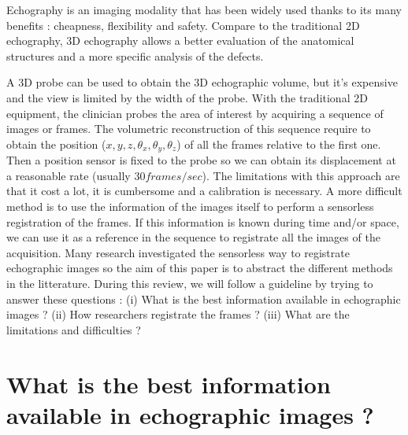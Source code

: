 \documentclass[runningheads,a4paper]{llncs}
\begin{document}
Echography is an imaging modality that has been widely used thanks to its many benefits : cheapness, flexibility and safety. 
Compare to the traditional 2D echography, 3D echography allows a better evaluation of the anatomical structures and a more specific analysis of the defects.\par
A 3D probe can be used to obtain the 3D echographic volume, but it's expensive and the view is limited by the width of the probe. 
With the traditional 2D equipment, the clinician probes the area of interest by acquiring a sequence of images or frames.
The volumetric reconstruction of this sequence require to obtain the position ($x,y,z,\theta_x, \theta_y, \theta_z$) of all the frames relative to the first one. 
Then a position sensor is fixed to the probe so we can obtain its displacement at a reasonable rate (usually $30 frames/sec$). 
The limitations with this approach are that it cost a lot, it is cumbersome and a calibration is necessary. 
A more difficult method is to use the information of the images itself to perform a sensorless registration of the frames. 
If this information is known during time and/or space, we can use it as a reference in the sequence to registrate all the images of the acquisition. Many research \cite{chen1997determination,tuthill1998automated,wagner1983statistics} investigated the sensorless way to registrate echographic images so the aim of this paper is to abstract the different methods in the litterature. During this review, we will follow a guideline by trying to answer these questions : (i) What is the best information available in echographic images ? (ii) How researchers registrate the frames ? (iii) What are the limitations and difficulties ?

\section{What is the best information available in echographic images ?}
\end{document}
